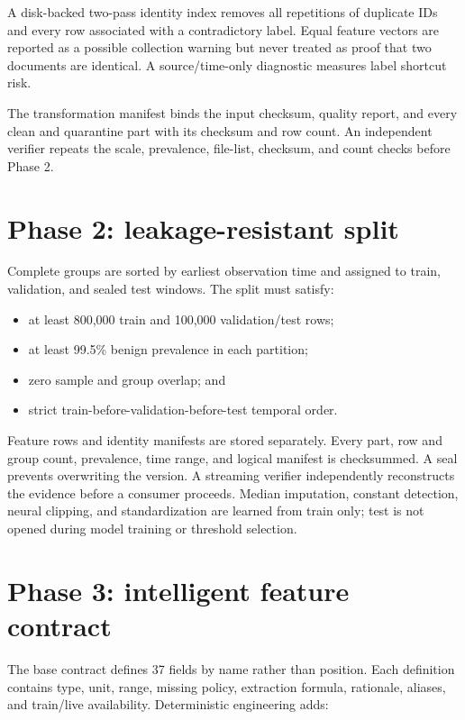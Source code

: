 \documentclass[11pt,a4paper]{article}
\begin{document}
A disk-backed two-pass identity index removes all repetitions of duplicate IDs
and every row associated with a contradictory label. Equal feature vectors are
reported as a possible collection warning but never treated as proof that two
documents are identical. A source/time-only diagnostic measures label shortcut
risk.

The transformation manifest binds the input checksum, quality report, and every
clean and quarantine part with its checksum and row count. An independent
verifier repeats the scale, prevalence, file-list, checksum, and count checks
before Phase 2.

\section{Phase 2: leakage-resistant split}

Complete groups are sorted by earliest observation time and assigned to train,
validation, and sealed test windows. The split must satisfy:

\begin{itemize}
  \item at least 800,000 train and 100,000 validation/test rows;
  \item at least 99.5\% benign prevalence in each partition;
  \item zero sample and group overlap; and
  \item strict train-before-validation-before-test temporal order.
\end{itemize}

Feature rows and identity manifests are stored separately. Every part, row and
group count, prevalence, time range, and logical manifest is checksummed. A seal
prevents overwriting the version. A streaming verifier independently reconstructs
the evidence before a consumer proceeds. Median imputation, constant detection,
neural clipping, and standardization are learned from train only; test is not
opened during model training or threshold selection.

\section{Phase 3: intelligent feature contract}

The base contract defines 37 fields by name rather than position. Each definition
contains type, unit, range, missing policy, extraction formula, rationale,
aliases, and train/live availability. Deterministic engineering adds:
\end{document}
